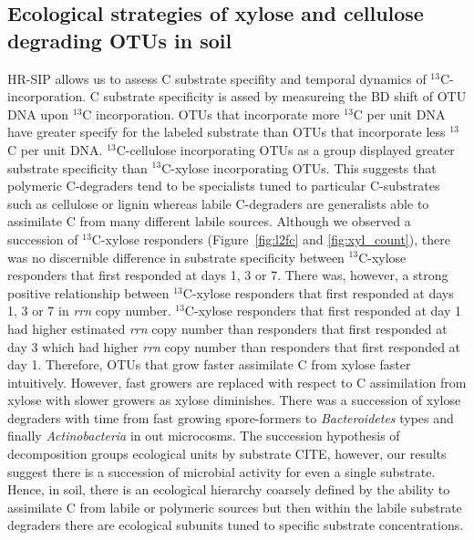 \subsection{Ecological strategies of xylose and cellulose degrading OTUs in soil}
HR-SIP allows us to assess C substrate specifity and temporal dynamics of
$^{13}$C-incorporation. C substrate specificity is assed by measureing the 
BD shift of OTU DNA upon $^{13}$C incorporation. OTUs that incorporate more
$^{13}$C per unit DNA have greater specify for the labeled substrate than
OTUs that incorporate less $^{13}$C per unit DNA. $^{13}$C-cellulose 
incorporating OTUs as a group displayed greater substrate specificity than
$^{13}$C-xylose incorporating OTUs. This suggests that polymeric C-degraders
tend to be specialists tuned to particular C-substrates such as cellulose
or lignin whereas labile C-degraders are generalists able to assimilate
C from many different labile sources. Although we observed a succession of 
$^{13}$C-xylose responders (Figure~\ref{fig:l2fc} and \ref{fig:xyl_count}), 
there was no discernible difference in substrate specificity between 
$^{13}$C-xylose responders that first responded at days 1, 3 or 7. There was,
however, a strong positive relationship between $^{13}$C-xylose responders that
first responded at days 1, 3 or 7 in \textit{rrn} copy number. $^{13}$C-xylose 
responders that first responded at day 1 had higher estimated \textit{rrn} copy 
number than responders that first responded at day 3 which had higher \textit{rrn}
copy number than responders that first responded at day 1. Therefore, OTUs that 
grow faster assimilate C from xylose faster intuitively. However, fast growers
are replaced with respect to C assimilation from xylose with slower growers as
xylose diminishes. There was a succession of xylose degraders with time from
fast growing spore-formers to \textit{Bacteroidetes} types and finally 
\textit{Actinobacteria} in out microcosms. The succession hypothesis of decomposition
groups ecological units by substrate CITE, however, our results suggest there is 
a succession of microbial activity for even a single substrate. Hence, in soil, there
is an ecological hierarchy coarsely defined by the ability to assimilate
C from labile or polymeric sources but then within the labile substrate 
degraders there are ecological subunits tuned to specific substrate concentrations.

